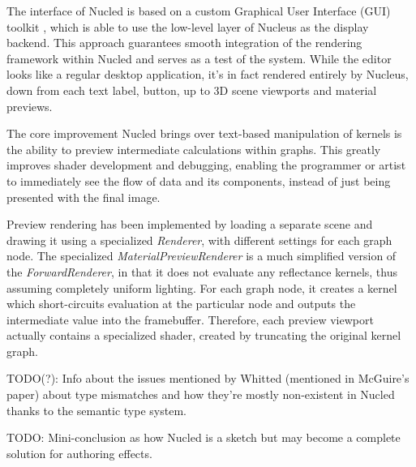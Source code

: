 The interface of Nucled is based on a custom Graphical User Interface (GUI) toolkit \cite{HybridGUI}, which is able to use the low-level layer of Nucleus as the display backend. This approach guarantees smooth integration of the rendering framework within Nucled and serves as a test of the system. While the editor looks like a regular desktop application, it's in fact rendered entirely by Nucleus, down from each text label, button, up to 3D scene viewports and material previews.

The core improvement Nucled brings over text-based manipulation of kernels is the ability to preview intermediate calculations within graphs. This greatly improves shader development and debugging, enabling the programmer or artist to immediately see the flow of data and its components, instead of just being presented with the final image.

Preview rendering has been implemented by loading a separate scene and drawing it using a specialized \emph{Renderer}, with different settings for each graph node. The specialized \emph{MaterialPreviewRenderer} is a much simplified version of the \emph{ForwardRenderer}, in that it does not evaluate any reflectance kernels, thus assuming completely uniform lighting. For each graph node, it creates a kernel which short-circuits evaluation at the particular node and outputs the intermediate value into the framebuffer. Therefore, each preview viewport actually contains a specialized shader, created by truncating the original kernel graph.

TODO(?): Info about the issues mentioned by Whitted (mentioned in McGuire's paper) about type mismatches and how they're mostly non-existent in Nucled thanks to the semantic type system.

TODO: Mini-conclusion as how Nucled is a sketch but may become a complete solution for authoring effects.
